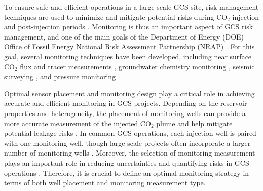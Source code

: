 \documentclass[10pt, twoside]{article}
\begin{document}
To ensure safe and efficient operations in a large-scale GCS site, risk management techniques are used to minimize and mitigate potential risks during CO$_2$ injection and post-injection periods \citep{Nicot2013388, Onishi201944, Dai20143908, Zhang20111631, Chadwick20051385}. Monitoring is thus an important aspect of GCS risk management, and one of the main goals of the Department of Energy (DOE) Office of Fossil Energy National Risk Assessment Partnership (NRAP) \citep{Pawar2016175}. For this goal, several monitoring techniques have been developed, including near surface CO$_2$ flux and tracer measurements \citep{Yang2012185, Ren2016108}, groundwater chemistry monitoring \citep{Dai2014, Yang20158887}, seismic surveying \citep{Ren2016108, Zhang20151, Chadwick2006303, Grana2017296}, and pressure monitoring \citep{Keating20144163, Wang2014188, Azzolina2014895, Oruganti20114140, Senel20134598}. 

Optimal sensor placement and monitoring design play a critical role in achieving accurate and efficient monitoring in GCS projects. Depending on the reservoir properties and heterogeneity, the placement of monitoring wells can provide a more accurate measurement of the injected CO$_2$ plume and help mitigate potential leakage risks \citep{Sun2019, Tang2022, Ma2022, Nwachukwu2018}. In common GCS operations, each injection well is paired with one monitoring well, though large-scale projects often incorporate a larger number of monitoring wells \citep{ButlerJr.19993553, Cardiff2012, Brauchler20132013}. Moreover, the selection of monitoring measurement plays an important role in reducing uncertainties and quantifying risks in GCS operations \citep{Chen2020, Sun2013, Seto2011845, Yang20158887, Yonkofski2016}. Therefore, it is crucial to define an optimal monitoring strategy in terms of both well placement and monitoring measurement type. 
\end{document}
